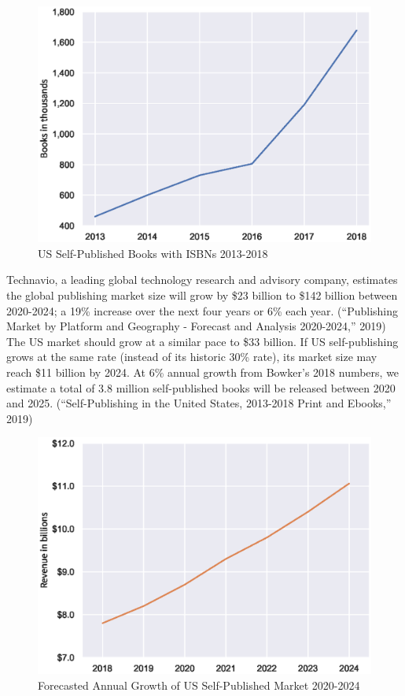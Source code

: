 \documentclass[11pt,openany]{book}
\begin{document}
\begin{figure}
\centering
\includegraphics{media/book-sales.eps}
\caption{US Self-Published Books with ISBNs 2013-2018}
\end{figure}

Technavio, a leading global technology research and advisory company,
estimates the global publishing market size will grow by \$23 billion to
\$142 billion between 2020-2024; a 19\% increase over the next four
years or 6\% each year. (``Publishing Market by Platform and Geography -
Forecast and Analysis 2020-2024,'' 2019) The US market should grow at a
similar pace to \$33 billion. If US self-publishing grows at the same
rate (instead of its historic 30\% rate), its market size may reach \$11
billion by 2024. At 6\% annual growth from Bowker's 2018 numbers, we
estimate a total of 3.8 million self-published books will be released
between 2020 and 2025. (``Self-Publishing in the United States,
2013-2018 Print and Ebooks,'' 2019)

\begin{figure}
\centering
\includegraphics{media/market-growth.eps}
\caption{Forecasted Annual Growth of US Self-Published Market 2020-2024}
\end{figure}
\end{document}

